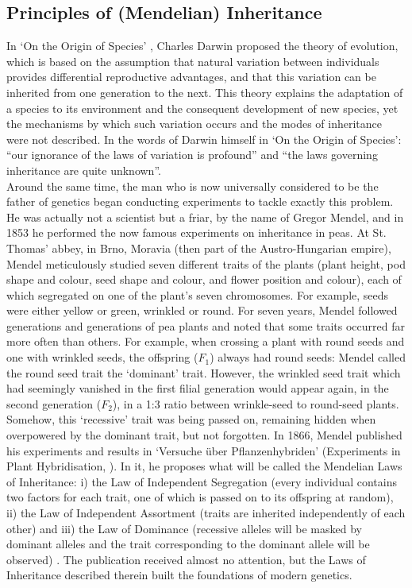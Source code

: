 \subsection{Principles of (Mendelian) Inheritance} %
\label{sec:Mendel}

In `On the Origin of Species' \cite{darwin1859origin}, Charles Darwin proposed the theory of evolution, which is based on the assumption that natural variation between individuals provides differential reproductive advantages, and that this variation can be inherited from one generation to the next. 
This theory explains the adaptation of a species to its environment and the consequent development of new species, yet the mechanisms by which such variation occurs and the modes of inheritance were not described. 
In the words of Darwin himself in `On the Origin of Species': “our ignorance of the laws of variation is profound” and “the laws governing inheritance are quite unknown”.\\

Around the same time, the man who is now universally considered to be the father of genetics began conducting experiments to tackle exactly this problem. 
He was actually not a scientist but a friar, by the name of Gregor Mendel, and in 1853 he performed the now famous experiments on inheritance in peas. 
At St. Thomas' abbey, in Brno, Moravia (then part of the Austro-Hungarian empire), Mendel meticulously studied seven different traits of the plants (plant height, pod shape and colour, seed shape and colour, and flower position and colour), each of which segregated on one of the plant's seven chromosomes. 
For example, seeds were either yellow or green, wrinkled or round. For seven years, Mendel followed generations and generations of pea plants and noted that some traits occurred far more often than others. 
For example, when crossing a plant with round seeds and one with wrinkled seeds, the offspring ($F_1$) always had round seeds: Mendel called the round seed trait the `dominant' trait. 
However, the wrinkled seed trait which had seemingly vanished in the first filial generation would appear again, in the second generation ($F_2$), in a 1:3 ratio between wrinkle-seed to round-seed plants. 
Somehow, this `recessive' trait was being passed on, remaining hidden when overpowered by the dominant trait, but not forgotten. 
In 1866, Mendel published his experiments and results in `Versuche über Pflanzenhybriden' (Experiments in Plant Hybridisation, \cite{mendel1996experiments}). 
In it, he proposes what will be called the Mendelian Laws of Inheritance: i) the Law of Independent Segregation (every individual contains two factors for each trait, one of which is passed on to its offspring at random), ii) the Law of Independent Assortment (traits are inherited independently of each other) and iii) the Law of Dominance (recessive alleles will be masked by dominant alleles and the trait corresponding to the dominant allele will be observed) \cite{mendel1996experiments}. 
The publication received almost no attention, but the Laws of Inheritance described therein built the foundations of modern genetics.\\

